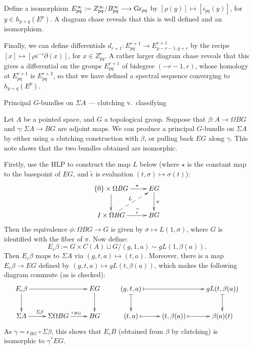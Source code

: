 \documentclass[11pt]{article}
\newcommand{\myheading}[1]
{{\noindent\Large #1}

}
\begin{document}
Define a isomorphism $E^\infty_{pq}:=Z_{pq}^\infty/B_{pq}^\infty\longrightarrow \textup{Gr}_{pq}$
by $[\rho(y)]\mapsto[i_{pq}(y)]$, for $y\in h_{p+q}(E^p)$. A diagram chase reveals that this is well defined and an isomorphism.

Finally, we can define differentials $d_{r+1}:E^{r+1}_{pq}\to E^{r+1}_{p-r-1,q+r}$ by the recipe $[x]\mapsto [\rho i^{-r}\partial(x)]$, for $x\in Z_{pq}^{r}$. A rather larger diagram chase reveals that this gives a differential on the groups $E^{r+1}_{pq}$ of bidegree $(-r-1,r)$, whose homology at $E^{r+1}_{pq}$ is $E^{r+2}_{pq}$, so that we have defined a spectral sequence converging to $h_{p+q}(E^p)$.

\pagebreak

\myheading{Principal $G$-bundles on $\Sigma A$ --- clutching v.\ classifying}
Let $A$ be a pointed space, and $G$ a topological group. Suppose that $\beta:A\to \Omega BG$ and $\gamma:\Sigma A\to BG$ are adjoint maps. We can produce a principal $G$-bundle on $\Sigma A$ by either using a clutching construction with $\beta$, or pulling back $EG$ along $\gamma$. This note shows that the two bundles obtained are isomorphic.

Firstly, use the HLP to construct the map $L$ below (where $\star$ is the constant map to the basepoint of $EG$, and $\widetilde\epsilon$ is evaluation $(t,\sigma)\mapsto \sigma(t)$):
\[\xymatrix{
\{0\}\times\Omega BG\ar[r]^{\ \ \ \ \star}\ar[d]&EG\ar[d]^{\pi}\\
I\times\Omega BG\ar[r]^{\ \ \ \ \widetilde\epsilon}\ar@{-->}[ru]^L&BG
}\]
Then the equivalence $\phi:\Omega BG\to G$ is given by $\sigma\mapsto L(1,\sigma)$, where $G$ is identified with the fiber of $\pi$. Now define:
\[E_c\beta:=G\times C(A)\sqcup G / (g,1,a)\sim gL(1,\beta(a)).\]
Then $E_c\beta$ maps to $\Sigma A$ via $(g,t,a)\mapsto(t,a)$. Moreover, there is a map $E_c\beta\to EG$ defined by $(g,t,a)\mapsto gL(t,\beta(a))$, which makes the following diagram commute (as is checked): 
\[\xymatrix{
E_c\beta\ar[rr]\ar[d]&&EG\ar[d]&
(g,t,a)\ar@{|->}[rr]\ar@{|->}[d]&&gL(t,\beta(a))\ar@{|->}[d]\\
\Sigma A\ar[r]^{\Sigma\beta}&\Sigma\Omega BG\ar[r]^{\epsilon_{BG}}&BG&
(t,a)\ar@{|->}[r]&(t,\beta(a))\ar@{|->}[r]&\beta(a)(t)
}\]
As $\gamma=\epsilon_{BG}\circ\Sigma\beta$, this shows that $E_cB$ (obtained from $\beta$ by clutching) is isomorphic to $\gamma^*EG$.
\pagebreak
\end{document}
